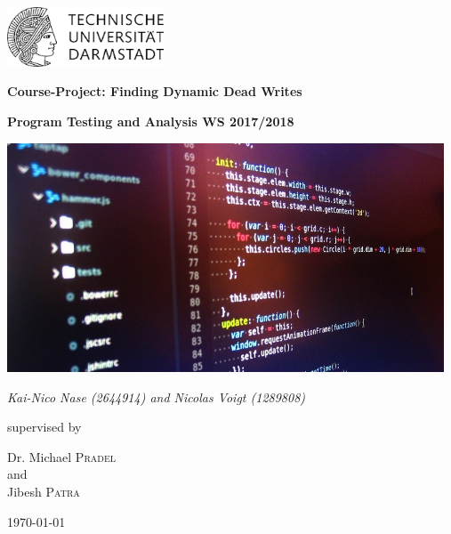 \documentclass[a4paper]{scrartcl}
\begin{document}
 

\begin{titlepage}
	\centering
	\includegraphics[width=0.35\textwidth]{TULOGO.png}\par\vspace{1cm}
	{\scshape\Large \par}
	\vspace{1.5cm}
	{\LARGE\bfseries Course-Project: Finding Dynamic Dead Writes\par}
	{\large\bfseries Program Testing and Analysis WS 2017/2018\par}
	\vspace{2cm}
	\begin{center}
	\includegraphics[width = 130mm]{Titlepage.jpg}
	\end{center}
	{\Large\itshape Kai-Nico Nase (2644914) and Nicolas Voigt (1289808)\par}
	
	\vfill
	supervised by\par
	Dr. Michael \textsc{Pradel}\\
	and\\
	Jibesh \textsc{Patra}	
    
	\vfill
	{\large \today\par}
\end{titlepage}

\newpage
\tableofcontents
\listoffigures%
\newpage

\end{document}
